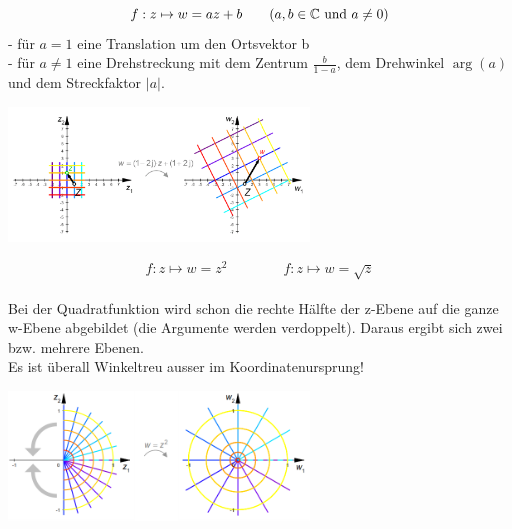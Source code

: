  	\begin{minipage}{9cm}
       $$ f : z \mapsto w = az + b \qquad (a, b \in \mathbb{C} \text{ und } a \neq0)\\$$
		- für $a = 1$ eine Translation um den Ortsvektor b \\
		- für $a \neq 1$ eine Drehstreckung mit dem Zentrum $\frac{b}{1-a}$, dem 
		Drehwinkel $\arg(a)$ und dem Streckfaktor $|a|$.  
    \end{minipage}
	\hspace{2cm}
	\begin{minipage}{8cm}
    	\includegraphics[width=8cm]{./bilder/LineareFunktion.png}
    \end{minipage}

	\begin{minipage}{9cm}
    	$$ f : z \mapsto w = z^2 \qquad \qquad f : z \mapsto w = \sqrt{z} $$\\
		Bei der Quadratfunktion wird schon die rechte Hälfte der z-Ebene auf die ganze
		w-Ebene abgebildet (die Argumente werden verdoppelt). Daraus ergibt sich
		zwei bzw. mehrere Ebenen.\\
		Es ist überall Winkeltreu ausser im Koordinatenursprung!
    \end{minipage}
	\hspace{2cm}
	\begin{minipage}{8cm}
    	\includegraphics[width=8cm]{./bilder/quadrat.png} 
    \end{minipage}

